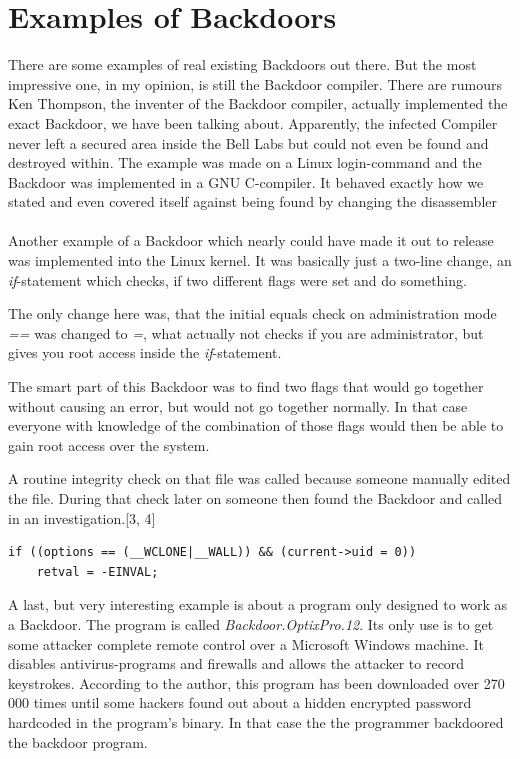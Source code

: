 \documentclass[a4paper, 12pt]{article}
\newenvironment{mySourceCode}
{\begin{list}{}{\setlength{\leftmargin}{2em}}\item\scriptsize\bfseries}
{\end{list}}
\begin{document}
\newpage


\section{Examples of Backdoors}

There are some examples of real existing Backdoors out there. But the most impressive one, in my opinion, is still the Backdoor compiler. There are rumours Ken Thompson, the inventer of the Backdoor compiler, actually implemented the exact Backdoor, we have been talking about. Apparently, the infected Compiler never left a secured area inside the Bell Labs but could not even be found and destroyed within. The example was made on a Linux login-command and the Backdoor was implemented in a GNU C-compiler. It behaved exactly how we stated and even covered itself against being found by changing the disassembler
\\
\\
Another example of a Backdoor which nearly could have made it out to release was implemented into the Linux kernel. It was basically just a two-line change, an \emph{if}-statement which checks, if two different flags were set and do something.

The only change here was, that the initial equals check on administration mode \emph{==} was changed to \emph{=}, what actually not checks if you are administrator, but gives you root access inside the \emph{if}-statement.

The smart part of this Backdoor was to find two flags that would go together without causing an error, but would not go together normally. In that case everyone with knowledge of the combination of those flags would then be able to gain root access over the system.

A routine integrity check on that file was called because someone manually edited the file. During that check later on someone then found the Backdoor and called in an investigation.[3, 4]
\begin{mySourceCode}
\normalsize
\begin{Verbatim}[samepage=true]
if ((options == (__WCLONE|__WALL)) && (current->uid = 0))
    retval = -EINVAL;
\end{Verbatim}
\end{mySourceCode}
A last, but very interesting example is about a program only designed to work as a Backdoor. The program is called \emph{Backdoor.OptixPro.12}. Its only use is to get some attacker complete remote control over a Microsoft Windows machine. It disables antivirus-programs and firewalls and allows the attacker to record keystrokes. According to the author, this program has been downloaded over 270 000 times until some hackers found out about a hidden encrypted password hardcoded in the program's binary. In that case the the programmer backdoored the backdoor program.
\end{document}
